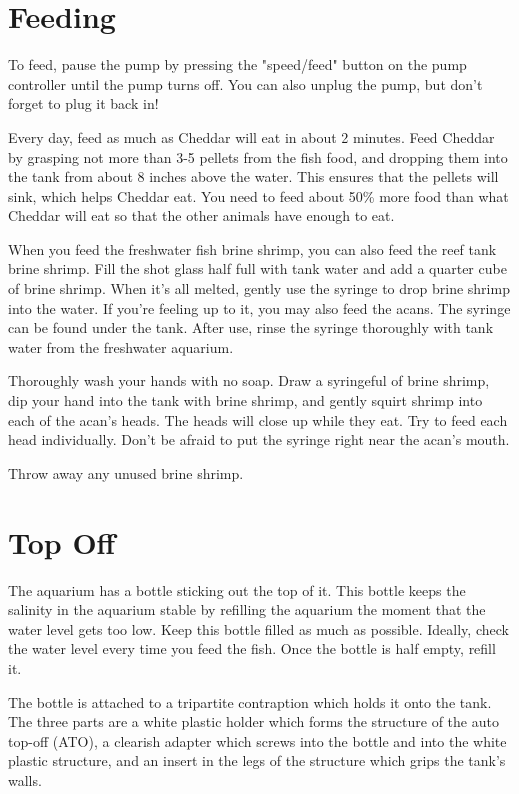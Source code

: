 \documentclass{report}
\begin{document}
\section{Feeding}
To feed, pause the pump by pressing the "speed/feed" button on the pump controller until the pump turns off. You can also 
unplug the pump, but don't forget to plug it back in!

Every day, feed as much as Cheddar will eat in about 2 minutes. Feed Cheddar by grasping not more than 3-5 pellets from the 
fish food, and dropping them into the tank from about 8 inches above the water. This ensures that the pellets will sink, 
which helps Cheddar eat. You need to feed about 50\% more food than what Cheddar will eat so that the other animals have 
enough to eat. 

When you feed the freshwater fish brine shrimp, you can also feed the reef tank brine shrimp. Fill the shot glass half full 
with tank water and add a quarter cube of brine shrimp. When it's all melted, gently use the syringe to drop brine shrimp 
into the water. If you're feeling up to it, you may also feed the acans. The syringe can be found under the tank. After use, rinse the syringe thoroughly with tank water from the freshwater aquarium.

Thoroughly wash your hands with no soap. Draw a syringeful of brine shrimp, dip your  hand into the tank with brine shrimp, 
and gently squirt shrimp into each of the acan's heads. The heads will close up while they eat. Try to feed each head 
individually. Don't be afraid to put the syringe right near the acan's mouth.

Throw away any unused brine shrimp. 

\section{Top Off}
\label{sec:ato}
The aquarium has a bottle sticking out the top of it. This bottle keeps the salinity in the aquarium stable by refilling the aquarium the moment that the water level gets too low. Keep this bottle filled as much as possible. Ideally, check the water level every time you feed the fish. Once the bottle is half empty, refill it. 

The bottle is attached to a tripartite contraption which holds it onto the tank. The three parts are a white plastic holder which forms the structure of the auto top-off (ATO), a clearish adapter which screws into the bottle and into the white plastic structure, and an insert in the legs of the structure which grips the tank's walls. 
\end{document}
